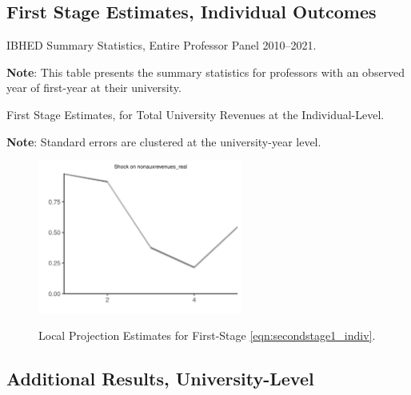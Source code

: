 \documentclass[notitlepage,12pt]{article}
\begin{document}
\subsection{First Stage Estimates, Individual Outcomes}
\label{appendix:part1}

\begin{table}[h!]
    \singlespacing
    \centering
    \caption{IBHED Summary Statistics, Entire Professor Panel 2010--2021.}
    \makebox[\textwidth][c]{}
    \label{tab:illinois-summary-rolling}
    \begin{flushleft}
        \footnotesize
        \textbf{Note}: This table presents the summary statistics for professors with an observed year of first-year at their university.
    \end{flushleft}
\end{table}

\begin{table}[H]
    \singlespacing
    \centering
    \caption{First Stage Estimates, for Total University Revenues at the Individual-Level.}
    \makebox[\textwidth][c]{}
    \label{tab:firststage-illinois}
    \begin{flushleft}
        \footnotesize
        \textbf{Note}: Standard errors are clustered at the university-year level.
    \end{flushleft}
\end{table}


\begin{figure}[h!]
    \centering
    \singlespacing
    \caption{Local Projection Estimates for First-Stage \autoref{eqn:secondstage1_indiv}.}
    \includegraphics[width=0.6\textwidth]{figures/firststage-illinois-lp-rolling.png}
    \label{fig:firststage-illinois-lp}
\end{figure}


\subsection{Additional Results, University-Level}
\end{document}
